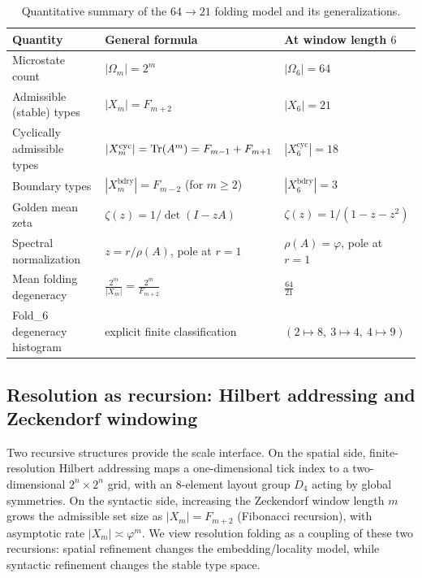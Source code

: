 \begin{table}[H]
\centering
\small
\setlength{\tabcolsep}{6pt}
\renewcommand{\arraystretch}{1.15}
\begin{tabular}{lll}
\toprule
Quantity & General formula & At window length $6$ \\
\midrule
Microstate count & $|\Omega_m|=2^m$ & $|\Omega_6|=64$ \\
Admissible (stable) types & $|X_m|=F_{m+2}$ & $|X_6|=21$ \\
Cyclically admissible types & $|X_m^{\mathrm{cyc}}|=\mathrm{Tr}(A^m)=F_{m-1}+F_{m+1}$ & $|X_6^{\mathrm{cyc}}|=18$ \\
Boundary types & $|X_m^{\mathrm{bdry}}|=F_{m-2}$ (for $m\ge 2$) & $|X_6^{\mathrm{bdry}}|=3$ \\
Golden mean zeta & $\zeta(z)=1/\det(I-zA)$ & $\zeta(z)=1/(1-z-z^2)$ \\
Spectral normalization & $z=r/\rho(A)$, pole at $r=1$ & $\rho(A)=\varphi$, pole at $r=1$ \\
Mean folding degeneracy & $\frac{2^m}{|X_m|}=\frac{2^m}{F_{m+2}}$ & $\frac{64}{21}$ \\
Fold\_6 degeneracy histogram & explicit finite classification & $(2\mapsto 8,\ 3\mapsto 4,\ 4\mapsto 9)$ \\
\bottomrule
\end{tabular}
\caption{Quantitative summary of the $64\to 21$ folding model and its generalizations.}
\label{tab:quant_summary}
\end{table}

\subsection{Resolution as recursion: Hilbert addressing and Zeckendorf windowing}
Two recursive structures provide the scale interface.
On the spatial side, finite-resolution Hilbert addressing maps a one-dimensional tick index to a two-dimensional $2^n\times 2^n$ grid, with an $8$-element layout group $D_4$ acting by global symmetries.
On the syntactic side, increasing the Zeckendorf window length $m$ grows the admissible set size as $|X_m|=F_{m+2}$ (Fibonacci recursion), with asymptotic rate $|X_m|\asymp \varphi^m$.
We view resolution folding as a coupling of these two recursions: spatial refinement changes the embedding/locality model, while syntactic refinement changes the stable type space.

